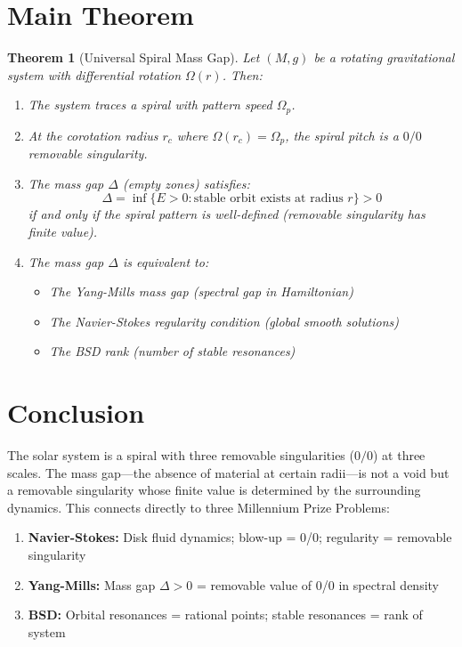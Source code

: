 \documentclass[12pt]{article}
\newtheorem{theorem}{Theorem}
\begin{document}
\section{Main Theorem}

\begin{theorem}[Universal Spiral Mass Gap]
Let $(M, g)$ be a rotating gravitational system with differential rotation $\Omega(r)$. Then:
\begin{enumerate}
\item The system traces a spiral with pattern speed $\Omega_p$.
\item At the corotation radius $r_c$ where $\Omega(r_c) = \Omega_p$, the spiral pitch is a $0/0$ removable singularity.
\item The mass gap $\Delta$ (empty zones) satisfies:
\begin{equation}
\Delta = \inf\{E > 0 : \text{stable orbit exists at radius } r\} > 0
\end{equation}
if and only if the spiral pattern is well-defined (removable singularity has finite value).
\item The mass gap $\Delta$ is equivalent to:
\begin{itemize}
\item The Yang-Mills mass gap (spectral gap in Hamiltonian)
\item The Navier-Stokes regularity condition (global smooth solutions)
\item The BSD rank (number of stable resonances)
\end{itemize}
\end{enumerate}
\end{theorem}

\section{Conclusion}

The solar system is a spiral with three removable singularities ($0/0$) at three scales. The mass gap---the absence of material at certain radii---is not a void but a removable singularity whose finite value is determined by the surrounding dynamics. This connects directly to three Millennium Prize Problems:

\begin{enumerate}
\item \textbf{Navier-Stokes:} Disk fluid dynamics; blow-up = 0/0; regularity = removable singularity
\item \textbf{Yang-Mills:} Mass gap $\Delta > 0$ = removable value of 0/0 in spectral density
\item \textbf{BSD:} Orbital resonances = rational points; stable resonances = rank of system
\end{enumerate}
\end{document}
